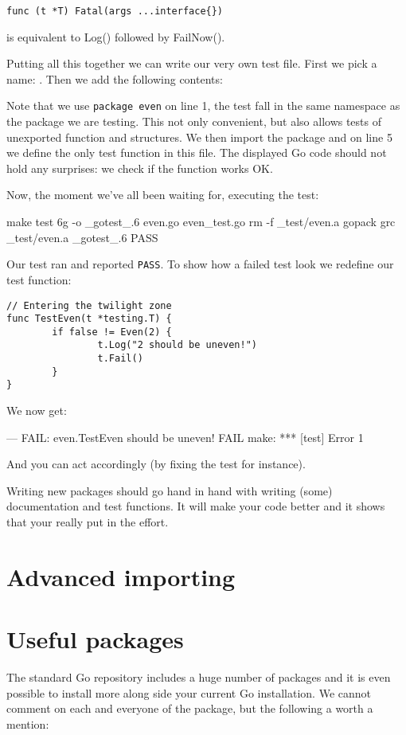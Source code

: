 \begin{lstlisting}[numbers=none]
func (t *T) Fatal(args ...interface{})
\end{lstlisting}
 is equivalent to Log() followed by FailNow().

Putting all this together we can write our very own test file. First
we pick a name: . Then we add the following contents:

Note that we use \lstinline{package even} on line 1, the test fall in the same
namespace as the package we are testing. This not only convenient, but
also allows tests of unexported function and structures. We then import
the  package and on line 5 we define the only test
function in this file. The displayed Go code should not hold any
surprises: we check if the  function works OK. 

Now, the moment we've all been waiting for, executing the test:
\begin{display}
\pr make test
6g -o \_gotest\_.6 even.go  even\_test.go
rm -f \_test/even.a
gopack grc \_test/even.a \_gotest\_.6 
PASS
\end{display}
\noindent{}Our test ran and reported \texttt{PASS}. To show how a failed
test look we redefine our test function:
\begin{lstlisting}
// Entering the twilight zone
func TestEven(t *testing.T) {
        if false != Even(2) {
                t.Log("2 should be uneven!")
                t.Fail()
        }   
}
\end{lstlisting}
We now get:
\begin{display}
--- FAIL: even.TestEven
\qquad{} should be uneven!
FAIL
make: *** [test] Error 1
\end{display}
\noindent{}And you can act accordingly (by fixing the test for instance).

\begin{lbar}
Writing new packages should go hand in hand with writing (some)
documentation and test functions. It will make your code better and it
shows that your really put in the effort.
\end{lbar}

\section{Advanced importing}

\section{Useful packages}
The standard Go repository includes a huge number of packages and it is
even possible to install more along side your current Go installation. 
We cannot comment on each and everyone of the package, but the following
a worth a mention:

